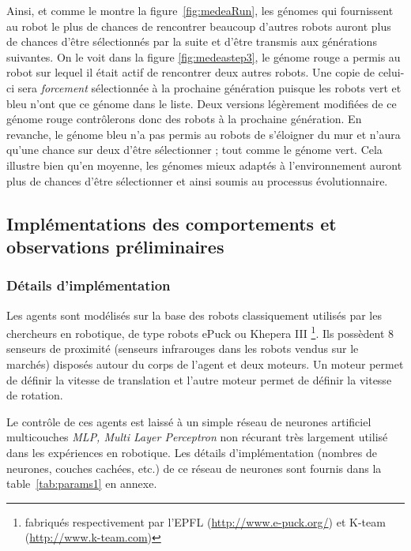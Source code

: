 \documentclass[a4paper,10pt]{report}
\begin{document}
Ainsi, et comme le montre la figure~\ref{fig:medeaRun}, les génomes qui fournissent au robot le plus de chances de rencontrer beaucoup d'autres robots auront plus de chances d'être sélectionnés par la suite et d'être transmis aux générations suivantes. On le voit dans la figure \ref{fig:medeastep3}, le génome rouge a permis au robot sur lequel il était actif de rencontrer deux autres robots. Une copie de celui-ci sera \emph{forcement} sélectionnée à la prochaine génération puisque les robots vert et bleu n'ont que ce génome dans le liste. Deux versions légèrement modifiées de ce génome rouge contrôlerons donc des robots à la prochaine génération. En revanche, le génome bleu n'a pas permis au robots de s'éloigner du mur et n'aura qu'une chance sur deux d'être sélectionner ; tout comme le génome vert. Cela illustre bien qu'en moyenne, les génomes mieux adaptés à l'environnement auront plus de chances d'être sélectionner et ainsi soumis au processus évolutionnaire.



\subsection{Implémentations des comportements et observations préliminaires}


\subsubsection{Détails d'implémentation}
\label{sec:detailsdimple}
Les agents sont modélisés sur la base des robots classiquement utilisés par les chercheurs en robotique, de type robots ePuck ou Khepera III \footnote{fabriqués respectivement par l'EPFL (\url{http://www.e-puck.org/}) et K-team (\url{http://www.k-team.com})}. Ils possèdent 8 senseurs de proximité (senseurs infrarouges dans les robots vendus sur le marchés) disposés autour du corps de l'agent et deux moteurs. Un moteur permet de définir la vitesse de translation et l'autre moteur permet de définir la vitesse de rotation.

Le contrôle de ces agents est laissé à un simple réseau de neurones artificiel multicouches \emph{MLP, Multi Layer Perceptron} non récurant très largement utilisé dans les expériences en robotique. Les détails d'implémentation (nombres de neurones, couches cachées, etc.) de ce réseau de neurones sont fournis dans la table~\ref{tab:params1} en annexe. 
\end{document}
